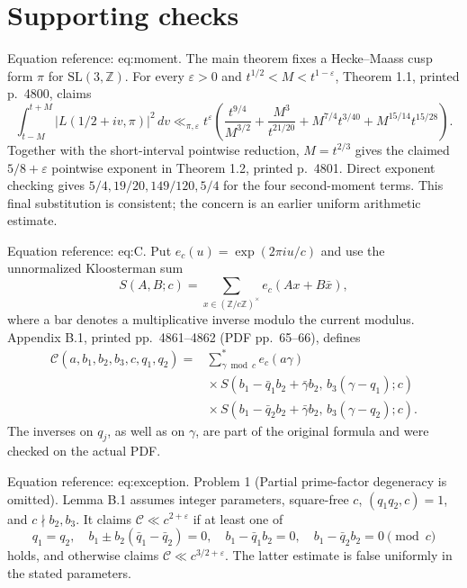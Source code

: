 \documentclass[10pt]{article}
\begin{document}
\section*{Supporting checks}
Equation reference: eq:moment. The main theorem fixes a Hecke–Maass cusp form \(\pi\) for \(\mathrm{SL}(3,\mathbb Z)\). For every \(\varepsilon>0\) and \(t^{1/2}<M<t^{1-\varepsilon}\), Theorem 1.1, printed p. 4800, claims \[
 \int_{t-M}^{t+M}|L(1/2+iv,\pi)|^2\,dv
 \ll_{\pi,\varepsilon}t^\varepsilon
 \left(\frac{t^{9/4}}{M^{3/2}}+
 \frac{M^3}{t^{21/20}}+M^{7/4}t^{3/40}
 +M^{15/14}t^{15/28}\right).\] Together with the short-interval pointwise reduction, \(M=t^{2/3}\) gives the claimed \(5/8+\varepsilon\) pointwise exponent in Theorem 1.2, printed p. 4801. Direct exponent checking gives \(5/4,19/20,149/120,5/4\) for the four second-moment terms. This final substitution is consistent; the concern is an earlier uniform arithmetic estimate.\par
Equation reference: eq:C. Put \(e_c(u)=\exp(2\pi i u/c)\) and use the unnormalized Kloosterman sum \[S(A,B;c)=\sum_{x\in(\mathbb Z/c\mathbb Z)^\times}
             e_c(Ax+B\bar x),\] where a bar denotes a multiplicative inverse modulo the current modulus. Appendix B.1, printed pp. 4861–4862 (PDF pp. 65–66), defines \[\begin{aligned}

 \mathcal C(a,b_1,b_2,b_3,c,q_1,q_2)
 ={}&\sum_{\gamma\bmod c}^{*} e_c(a\gamma)\nonumber\\
 &{}\times S(b_1-\bar q_1b_2+\bar\gamma b_2,\,
                  b_3(\gamma-q_1);c)\nonumber\\
 &{}\times S(b_1-\bar q_2b_2+\bar\gamma b_2,\,
                  b_3(\gamma-q_2);c).\end{aligned}\] The inverses on \(q_j\), as well as on \(\gamma\), are part of the original formula and were checked on the actual PDF.\par
Equation reference: eq:exception. Problem 1 (Partial prime-factor degeneracy is omitted).  Lemma B.1 assumes integer parameters, square-free \(c\), \((q_1q_2,c)=1\), and \(c\nmid b_2,b_3\). It claims \(\mathcal C\ll c^{2+\varepsilon}\) if at least one of \[
 q_1=q_2,\quad
 b_1\pm b_2(\bar q_1-\bar q_2)=0,\quad
 b_1-\bar q_1b_2=0,\quad b_1-\bar q_2b_2=0
 \pmod c\] holds, and otherwise claims \(\mathcal C\ll c^{3/2+\varepsilon}\). The latter estimate is false uniformly in the stated parameters.\par
\end{document}
